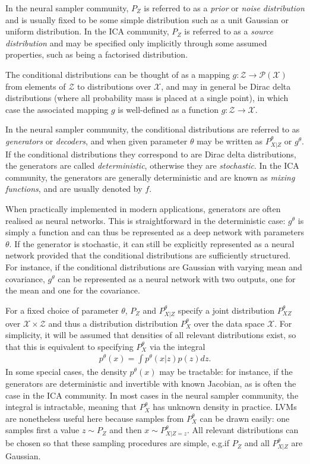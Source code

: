 In the neural sampler community, $P_Z$ is referred to as a \emph{prior} or \emph{noise distribution} and is usually fixed to be some simple distribution such as a unit Gaussian or uniform distribution. 
In the ICA community, $P_Z$ is referred to as a \emph{source distribution} and may be specified only implicitly through some assumed properties, such as being a factorised distribution.

The conditional distributions can be thought of as a mapping $g:\mathcal{Z}\to\mathcal{P}(\mathcal{X})$ from elements of $\mathcal{Z}$ to distributions over $\mathcal{X}$,
and may in general be Dirac delta distributions (where all probability mass is placed at a single point), in which case the associated mapping $g$ is well-defined as a function $g:\mathcal{Z}\to\mathcal{X}$. 

In the neural sampler community, the conditional distributions are referred to as \emph{generators} or \emph{decoders}, and when given parameter $\theta$ may be written as $P_{X|Z}^\theta$ or $g^\theta$. 
If the conditional distributions they correspond to are Dirac delta distributions, the generators are called \emph{deterministic}, otherwise they are \emph{stochastic}.
In the ICA community, the generators are generally deterministic and are known as \emph{mixing functions}, and are usually denoted by $f$.

When practically implemented in modern applications, generators are often realised as neural networks.
This is straightforward in the deterministic case: $g^\theta$ is simply a function and can thus be represented as a deep network with parameters $\theta$.
If the generator is stochastic, it can still be explicitly represented as a neural network provided that the conditional distributions are sufficiently structured. 
For instance, if the conditional distributions are Gaussian with varying mean and covariance, $g^\theta$ can be represented as a neural network with two outputs, one for the mean and one for the covariance.


For a fixed choice of parameter $\theta$, $P_Z$ and $P^\theta_{X|Z}$ specify a joint distribution $P^\theta_{XZ}$ over $\mathcal{X} \times \mathcal{Z}$ and thus a distribution distribution $P_X^\theta$ over the data space $\mathcal{X}$. 
For simplicity, it will be assumed that densities of all relevant distributions exist, so that this is equivalent to specifying $P_X^\theta$ via the integral
%
\begin{align*}
p^\theta(x) = \int p^\theta(x|z) p(z) dz.
\end{align*}
%
In some special cases, the density $p^\theta(x)$ may be tractable: for instance, if the generators are deterministic and invertible with known Jacobian, as is often the case in the ICA community.
In most cases in the neural sampler community, the integral is intractable, meaning that $P_X^\theta$ has unknown density in practice.
LVMs are nonetheless useful here because samples from $P_X^\theta$ can be drawn easily:
one samples first a value $z\sim P_Z$ and then $x \sim P^\theta_{X|Z=z}$. 
All relevant distributions can be chosen so that these sampling procedures are simple, e.g.\:if $P_Z$ and all $P^\theta_{X|Z}$ are Gaussian. 


